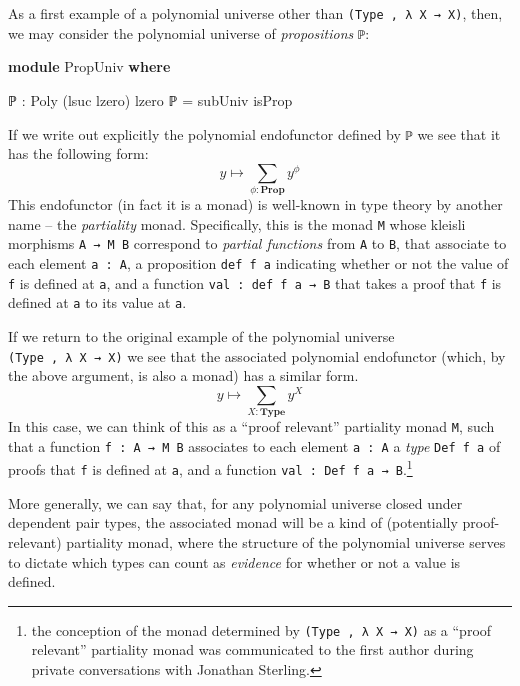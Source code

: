 \documentclass[
  11pt,
  oneside,
  article]{memoir}
\newenvironment{Shaded}{}{}
\newcommand{\KeywordTok}[1]{\textcolor[rgb]{0.00,0.44,0.13}{\textbf{#1}}}
\newcommand{\NormalTok}[1]{#1}
\newcommand{\OtherTok}[1]{\textcolor[rgb]{0.00,0.44,0.13}{#1}}
\theoremstyle{definition}
\theoremstyle{plain}
\newcommand{\0}{\textsf{0}}
\newcommand{\1}{\tn{\textsf{1}}}
\begin{document}
As a first example of a polynomial universe other than
\texttt{(Type\ ,\ λ\ X\ →\ X)}, then, we may consider the polynomial
universe of \emph{propositions} \texttt{ℙ}:

\begin{Shaded}
\begin{Highlighting}[]
\KeywordTok{module}\NormalTok{ PropUniv }\KeywordTok{where}

\NormalTok{    ℙ }\OtherTok{:}\NormalTok{ Poly }\OtherTok{(}\NormalTok{lsuc lzero}\OtherTok{)}\NormalTok{ lzero}
\NormalTok{    ℙ }\OtherTok{=}\NormalTok{ subUniv isProp}
\end{Highlighting}
\end{Shaded}

If we write out explicitly the polynomial endofunctor defined by
\texttt{ℙ} we see that it has the following form: \[
y \mapsto \sum_{\phi : \mathbf{Prop}} y^\phi
\] This endofunctor (in fact it is a monad) is well-known in type theory
by another name -- the \emph{partiality} monad. Specifically, this is
the monad \texttt{M} whose kleisli morphisms \texttt{A\ →\ M\ B}
correspond to \emph{partial functions} from \texttt{A} to \texttt{B},
that associate to each element \texttt{a\ :\ A}, a proposition
\texttt{def\ f\ a} indicating whether or not the value of \texttt{f} is
defined at \texttt{a}, and a function \texttt{val\ :\ def\ f\ a\ →\ B}
that takes a proof that \texttt{f} is defined at \texttt{a} to its value
at \texttt{a}.

If we return to the original example of the polynomial universe
\texttt{(Type\ ,\ λ\ X\ →\ X)} we see that the associated polynomial
endofunctor (which, by the above argument, is also a monad) has a
similar form. \[
y \mapsto \sum_{X : \mathbf{Type}} y^X
\] In this case, we can think of this as a ``proof relevant'' partiality
monad \texttt{M}, such that a function \texttt{f\ :\ A\ →\ M\ B}
associates to each element \texttt{a\ :\ A} a \emph{type}
\texttt{Def\ f\ a} of proofs that \texttt{f} is defined at \texttt{a},
and a function \texttt{val\ :\ Def\ f\ a\ →\ B}.\footnote{the conception
  of the monad determined by \texttt{(Type\ ,\ λ\ X\ →\ X)} as a ``proof
  relevant'' partiality monad was communicated to the first author
  during private conversations with Jonathan Sterling.}

More generally, we can say that, for any polynomial universe closed
under dependent pair types, the associated monad will be a kind of
(potentially proof-relevant) partiality monad, where the structure of
the polynomial universe serves to dictate which types can count as
\emph{evidence} for whether or not a value is defined.
\end{document}
